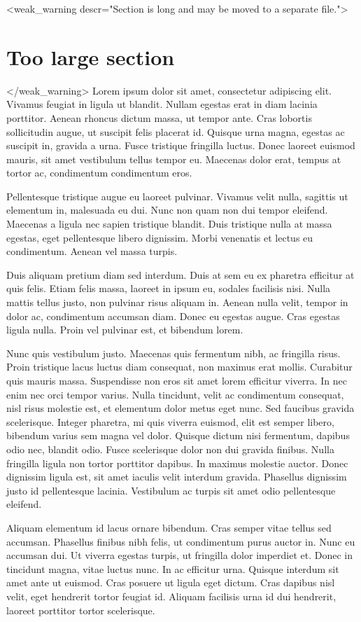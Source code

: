 \documentclass[11pt]{article}
\begin{document}
    <weak_warning descr="Section is long and may be moved to a separate file.">\section{Too large section}</weak_warning>
    Lorem ipsum dolor sit amet, consectetur adipiscing elit. Vivamus feugiat in ligula ut blandit. Nullam egestas erat in diam lacinia porttitor. Aenean rhoncus dictum massa, ut tempor ante. Cras lobortis sollicitudin augue, ut suscipit felis placerat id. Quisque urna magna, egestas ac suscipit in, gravida a urna. Fusce tristique fringilla luctus. Donec laoreet euismod mauris, sit amet vestibulum tellus tempor eu. Maecenas dolor erat, tempus at tortor ac, condimentum condimentum eros.

    Pellentesque tristique augue eu laoreet pulvinar. Vivamus velit nulla, sagittis ut elementum in, malesuada eu dui. Nunc non quam non dui tempor eleifend. Maecenas a ligula nec sapien tristique blandit. Duis tristique nulla at massa egestas, eget pellentesque libero dignissim. Morbi venenatis et lectus eu condimentum. Aenean vel massa turpis.

    Duis aliquam pretium diam sed interdum. Duis at sem eu ex pharetra efficitur at quis felis. Etiam felis massa, laoreet in ipsum eu, sodales facilisis nisi. Nulla mattis tellus justo, non pulvinar risus aliquam in. Aenean nulla velit, tempor in dolor ac, condimentum accumsan diam. Donec eu egestas augue. Cras egestas ligula nulla. Proin vel pulvinar est, et bibendum lorem.

    Nunc quis vestibulum justo. Maecenas quis fermentum nibh, ac fringilla risus. Proin tristique lacus luctus diam consequat, non maximus erat mollis. Curabitur quis mauris massa. Suspendisse non eros sit amet lorem efficitur viverra. In nec enim nec orci tempor varius. Nulla tincidunt, velit ac condimentum consequat, nisl risus molestie est, et elementum dolor metus eget nunc. Sed faucibus gravida scelerisque. Integer pharetra, mi quis viverra euismod, elit est semper libero, bibendum varius sem magna vel dolor. Quisque dictum nisi fermentum, dapibus odio nec, blandit odio. Fusce scelerisque dolor non dui gravida finibus. Nulla fringilla ligula non tortor porttitor dapibus. In maximus molestie auctor. Donec dignissim ligula est, sit amet iaculis velit interdum gravida. Phasellus dignissim justo id pellentesque lacinia. Vestibulum ac turpis sit amet odio pellentesque eleifend.

    Aliquam elementum id lacus ornare bibendum. Cras semper vitae tellus sed accumsan. Phasellus finibus nibh felis, ut condimentum purus auctor in. Nunc eu accumsan dui. Ut viverra egestas turpis, ut fringilla dolor imperdiet et. Donec in tincidunt magna, vitae luctus nunc. In ac efficitur urna. Quisque interdum sit amet ante ut euismod. Cras posuere ut ligula eget dictum. Cras dapibus nisl velit, eget hendrerit tortor feugiat id. Aliquam facilisis urna id dui hendrerit, laoreet porttitor tortor scelerisque.
\end{document}
